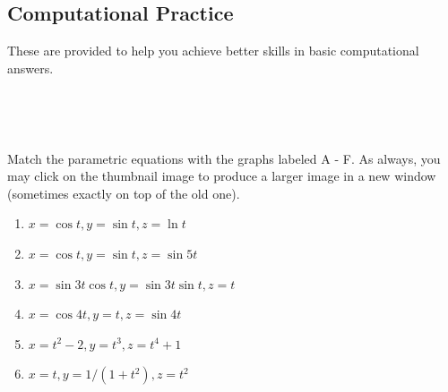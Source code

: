 \documentclass[10pt,]{book}
\theoremstyle{plain}
\theoremstyle{definition}
\theoremstyle{definition}
\theoremstyle{definition}
\theoremstyle{definition}
\theoremstyle{definition}
\numberwithin{equation}{section}
\begin{document}
\subsection[{Computational Practice}]{Computational Practice}\label{exercises-14}
These are provided to help you achieve better skills in basic computational answers.%
\begin{exerciselist}
\item[1.]\hypertarget{exercise-64}{}\mbox{}\\ %
\begin{mdframed}
{
\leavevmode\\\relax 

Match the parametric equations with the graphs labeled A - F.  As
always, you may click on the thumbnail image to produce a larger image
in a new window (sometimes exactly on top of the old one).

\par 

     
\par\begin{enumerate}
\item[\mbox{\parbox[t]{3ex}{\hrulefill}}1.] \(x = \cos t, y = \sin t, z = \ln t\)
\item[\mbox{\parbox[t]{3ex}{\hrulefill}}2.] \(x = \cos t, y = \sin t, z = \sin 5t\)
\item[\mbox{\parbox[t]{3ex}{\hrulefill}}3.] \(x = \sin 3t \cos t, y = \sin 3t \sin t, z = t\)
\item[\mbox{\parbox[t]{3ex}{\hrulefill}}4.] \(x=\cos 4t, y = t, z = \sin 4t\)
\item[\mbox{\parbox[t]{3ex}{\hrulefill}}5.] \(x = t^2 - 2, y = t^3, z = t^4 + 1\)
\item[\mbox{\parbox[t]{3ex}{\hrulefill}}6.] \(x = t, y = 1/(1+t^2), z = t^2\)
\end{enumerate}

}
\end{mdframed}
\end{exerciselist}
\end{document}

